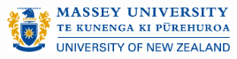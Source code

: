 \documentclass[11pt, a4paper, oneside]{Thesis} %
\begin{document}
\begin{titlepage}
\begin{center}

\href{http://www.massey.ac.nz}{\includegraphics[width=0.5\textwidth]{./Pictures/masseyUniversityLogo.png}}\\[1.5cm]

\vfill

\end{center}
\end{titlepage}

%
%
%
%
%
%
%
\end{document}
